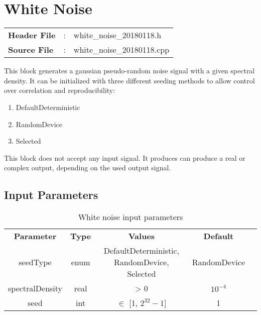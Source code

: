 \clearpage

\section{White Noise}

\begin{tcolorbox}	
	\begin{tabular}{p{2.75cm} p{0.2cm} p{10.5cm}} 	
		\textbf{Header File}   &:& white\_noise\_20180118.h \\
		\textbf{Source File}   &:& white\_noise\_20180118.cpp \\
	\end{tabular}
\end{tcolorbox}

\maketitle
This block generates a gaussian pseudo-random noise signal with a given spectral density. It can be initialized with three different seeding methods to allow control over correlation and reproducibility:

\begin{enumerate}
	\item DefaultDeterministic
	\item RandomDevice
	\item Selected
\end{enumerate}

This block does not accept any input signal. It produces can produce a real or complex output, depending on the used output signal.

\subsection*{Input Parameters}

\begin{table}[h]
	\centering
	\begin{tabular}{|c|c|c|c|c}
		\cline{1-4}
		\textbf{Parameter} & \textbf{Type} &\textbf{Values} &   \textbf{Default}& \\ \cline{1-4}
		seedType 		 & enum & DefaultDeterministic, RandomDevice, Selected & RandomDevice \\ \cline{1-4}
		spectralDensity  & real & > 0  			& $10^{-4}$ \\ \cline{1-4}
		seed 	   		 & int & $\in$ [1, $2^{32}-1$] 	& 1 \\ \cline{1-4} \cline{1-4}
	\end{tabular}
	\caption{White noise input parameters}
	\label{table:noise_in_par}
\end{table}

